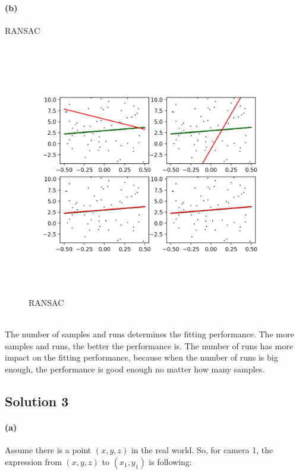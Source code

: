 \documentclass{article}
\newcommand{\solution}[1]{\clearpage \subsection*{Solution #1}}  %
\newcommand{\spart}[1]{\paragraph{(#1)}}
\begin{document}
\newpage
\spart{b}
RANSAC
\begin{figure}[h!]
  \centering
	\includegraphics[height=30em]{code/outputs/prob2b.png}
	  \caption{RANSAC}
\end{figure}
\\
The number of samples and runs determines the fitting performance. The more samples and runs, the better the performance is. The number of runs has more impact on the fitting performance, because when the number of runs is big enough, the performance is good enough no matter how many samples.

\solution{3}
\spart{a}
Assume there is a point $\left(x, y, z\right)$ in the real world. So, for camera 1, the expression from $\left(x, y, z\right)$ to $\left(x_1, y_1\right)$ is following:
\end{document}
